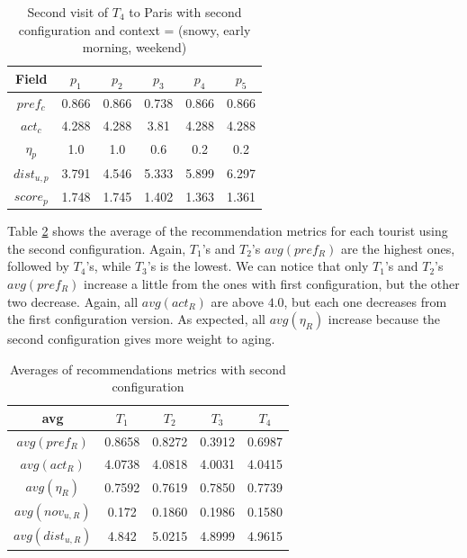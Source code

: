 \begin{table}[h!]
\vspace{-0.3cm}
\footnotesize{
    \centering
        \caption{Second visit of $T_4$ to Paris with second configuration and context = (snowy,  early morning, weekend)}
    \label{table:2nd-t4-Paris-2}
    \vspace{-0.3cm}
    \begin{tabular}{ |c|c|c|c|c|c| } 
        \hline
        Field   & $p_1$ & $p_2$ & $p_3$ & $p_4$ & $p_5$ \\
        \hline
        $pref_c$    &  0.866 & 0.866 & 0.738 & 0.866 & 0.866 \\
        $act_c$     & 4.288 & 4.288 & 3.81 & 4.288 & 4.288  \\
        $\eta_p$    & 1.0 & 1.0 & 0.6 & 0.2 & 0.2 \\
        $dist_{u,p}$ & 3.791 & 4.546 & 5.333 & 5.899 & 6.297 \\
        $score_p$    & 1.748 & 1.745 & 1.402 & 1.363 & 1.361 \\
        
        \hline
    \end{tabular}
    }
    \vspace{-0.2cm}
\end{table}

Table \ref{table:config-2} shows the average of the recommendation metrics for each tourist using the second configuration. Again, $T_1$'s and $T_2$'s $avg(pref_R)$ are the highest ones, followed by $T_4$'s, while $T_3$'s is the lowest. We can notice that only $T_1$'s and $T_2$'s $avg(pref_R)$ increase a little from the ones with first configuration, but the other two decrease. Again, all $avg(act_R)$ are above $4.0$, but each one decreases from the first configuration version. As expected, all $avg(\eta_R)$ increase because the second configuration gives more weight to aging.

\begin{table}[h!]
\vspace{-0.1cm}
\footnotesize{
    \centering
    \caption{Averages of recommendations metrics with second configuration}
    \label{table:config-2}
    \vspace{-0.3cm}
    \begin{tabular}{ |c|c|c|c|c| } 
        \hline
        avg & $T_1$ & $T_2$ & $T_3$ & $T_4$ \\
        \hline
        \hline
        $avg(pref_R)$ & 0.8658 & 0.8272 & 0.3912 & 0.6987 \\
        $avg(act_R)$ & 4.0738 & 4.0818 & 4.0031 & 4.0415 \\
        $avg(\eta_R)$ & 0.7592 & 0.7619 & 0.7850 & 0.7739 \\
        $avg(nov_{u,R})$ & 0.172 & 0.1860 & 0.1986 & 0.1580 \\
        $avg(dist_{u,R})$ & 4.842 & 5.0215 & 4.8999 & 4.9615 \\
       
        \hline
    \end{tabular}
    }
    \vspace{-0.2cm}
\end{table}

